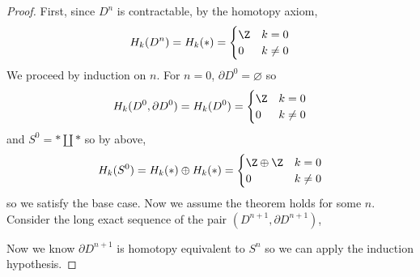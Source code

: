 \documentclass[12pt]{extarticle}
\begin{document}
\begin{proof}
First, since $D^n$ is contractable, by the homotopy axiom, 
\[ H_k(D^n) = H_k(*) = 
\begin{cases}
\Z & k = 0
\\
0 & k \neq 0
\end{cases} \]
We proceed by induction on $n$. 
For $n = 0$, $\partial D^0 = \varnothing$ so \[ H_k(D^0, \partial D^0) = H_k(D^0) = \begin{cases}
\Z & k = 0
\\
0 & k \neq 0
\end{cases} \]
and $S^0 = * \coprod *$ so by above,
\[ H_k(S^0) = H_k(*) \oplus H_k(*) = 
\begin{cases}
\Z \oplus \Z & k = 0
\\
0 & k \neq 0 
\end{cases} \]
so we satisfy the base case. Now we assume the theorem holds for some $n$. Consider the long exact sequence of the pair $(D^{n+1}, \partial D^{n+1})$,
\begin{center}
\end{center}
Now we know $\partial D^{n+1}$ is homotopy equivalent to $S^n$ so we can apply the induction hypothesis. 
\end{proof}

\begin{proposition}

\end{proposition}

\begin{proposition}

\end{proposition}

\begin{proposition}

\end{proposition}

\begin{proposition}

\end{proposition}

\begin{proposition}

\end{proposition}
\end{document}
